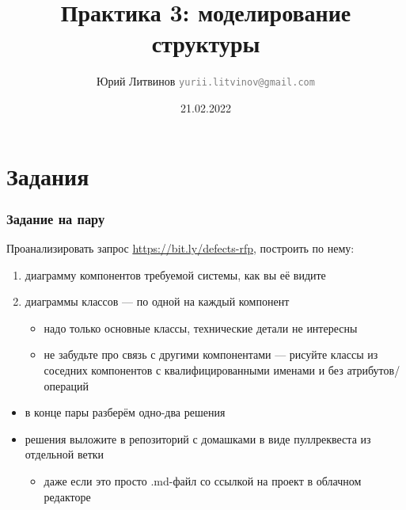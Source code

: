 \documentclass[xetex,mathserif,serif]{beamer}
\title{Практика 3: моделирование структуры}
\author[Юрий Литвинов]{Юрий Литвинов \newline \textcolor{gray}{\small\texttt{yurii.litvinov@gmail.com}}}
\date{21.02.2022}
\begin{document}
    
    \frame{\titlepage}

    \section{Задания}

    \begin{frame}
        \frametitle{Задание на пару}
        Проанализировать запрос \url{https://bit.ly/defects-rfp}, построить по нему:
        \begin{enumerate}
            \item диаграмму компонентов требуемой системы, как вы её видите
            \item диаграммы классов --- по одной на каждый компонент
            \begin{itemize}
                \item надо только основные классы, технические детали не интересны
                \item не забудьте про связь с другими компонентами --- рисуйте классы из соседних компонентов с квалифицированными именами и без атрибутов/операций
            \end{itemize}
        \end{enumerate}
        \vspace{3mm}
        \begin{itemize}
            \item в конце пары разберём одно-два решения
            \item решения выложите в репозиторий с домашками в виде пуллреквеста из отдельной ветки
            \begin{itemize}
                \item даже если это просто .md-файл со ссылкой на проект в облачном редакторе
            \end{itemize}
        \end{itemize}
    \end{frame}
\end{document}
